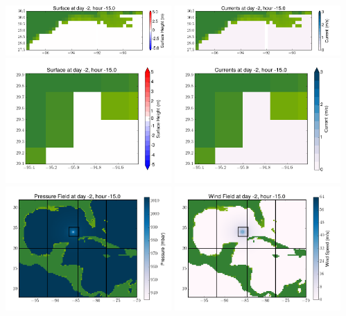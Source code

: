 \documentclass[11pt]{article}
\begin{document}
\includegraphics[width=0.475\textwidth]{frame0009fig4.png}
\vskip 10pt 
\includegraphics[width=0.475\textwidth]{frame0009fig5.png}
\includegraphics[width=0.475\textwidth]{frame0009fig6.png}
\vskip 10pt 
\includegraphics[width=0.475\textwidth]{frame0009fig7.png}
\includegraphics[width=0.475\textwidth]{frame0009fig8.png}
\vskip 10pt 
\includegraphics[width=0.475\textwidth]{frame0009fig9.png}
\end{document}
